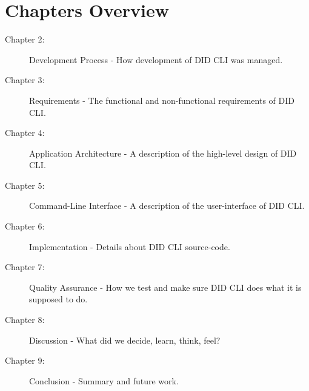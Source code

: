 \section{Chapters Overview}

\begin{description}
    \item[Chapter 2:] Development Process - How development of DID CLI was managed.
    \item[Chapter 3:] Requirements - The functional and non-functional requirements of DID CLI.
    \item[Chapter 4:] Application Architecture - A description of the high-level design of DID CLI.
    \item[Chapter 5:] Command-Line Interface - A description of the user-interface of DID CLI.
    \item[Chapter 6:] Implementation - Details about DID CLI source-code.
    \item[Chapter 7:] Quality Assurance - How we test and make sure DID CLI does what it is supposed to do. 
    \item[Chapter 8:] Discussion - What did we decide, learn, think, feel?
    \item[Chapter 9:] Conclusion - Summary and future work.
\end{description}
